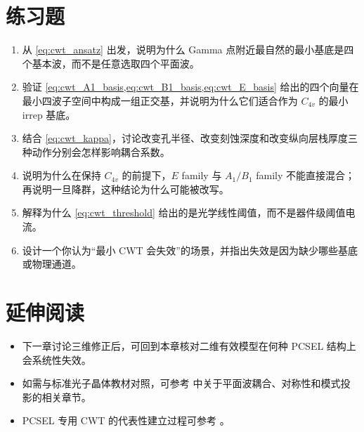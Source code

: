 \section*{练习题}
\begin{enumerate}
  \item \basicq 从 \cref{eq:cwt_ansatz} 出发，说明为什么 Gamma 点附近最自然的最小基底是四个基本波，而不是任意选取四个平面波。

  \item \basicq 验证 \cref{eq:cwt_A1_basis,eq:cwt_B1_basis,eq:cwt_E_basis} 给出的四个向量在最小四波子空间中构成一组正交基，并说明为什么它们适合作为 $C_{4v}$ 的最小 irrep 基底。

  \item \midq 结合 \cref{eq:cwt_kappa}，讨论改变孔半径、改变刻蚀深度和改变纵向层栈厚度三种动作分别会怎样影响耦合系数。

  \item \midq 说明为什么在保持 $C_{4v}$ 的前提下，$E$ family 与 $A_1/B_1$ family 不能直接混合；再说明一旦降群，这种结论为什么可能被改写。

  \item \midq 解释为什么 \cref{eq:cwt_threshold} 给出的是光学线性阈值，而不是器件级阈值电流。

  \item \hardq 设计一个你认为“最小 CWT 会失效”的场景，并指出失效是因为缺少哪些基底或物理通道。
\end{enumerate}

\section*{延伸阅读}
\begin{itemize}
  \item 下一章讨论三维修正后，可回到本章核对二维有效模型在何种 PCSEL 结构上会系统性失效。

  \item 如需与标准光子晶体教材对照，可参考 \cite{joannopoulos2008,sakoda2005} 中关于平面波耦合、对称性和模式投影的相关章节。

  \item PCSEL 专用 CWT 的代表性建立过程可参考 \cite{liang2012square,liang2013triangular}。
\end{itemize}
